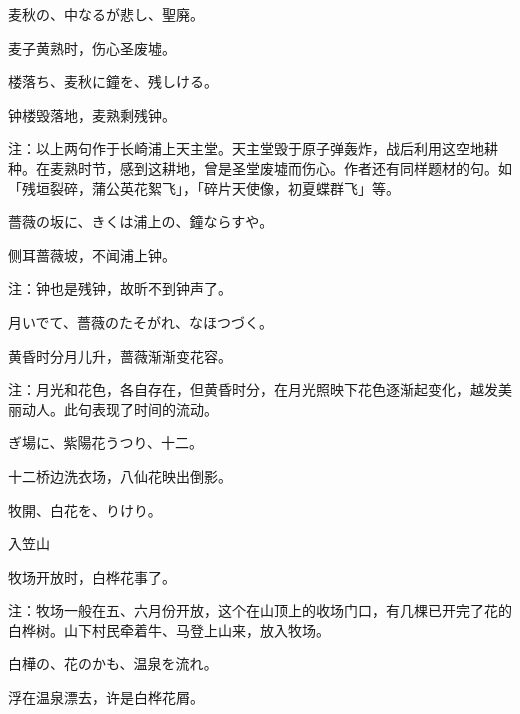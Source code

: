 \begin{haiku}
    {\FH 麦秋の、中なるが悲し、聖廃。}

    {\FK 麦子黄熟时，伤心圣废墟。}
\end{haiku}

\begin{haiku}
    {\FH {}楼落ち、麦秋に鐘を、残しける。}

    {\FK 钟楼毁落地，麦熟剩残钟。}

    {\FT 注：以上两句作于长崎浦上天主堂。天主堂毁于原子弹轰炸，战后利用这空地耕种。在麦熟时节，感到这耕地，曾是圣堂废墟而伤心。作者还有同样题材的句。如「残垣裂碎，蒲公英花絮飞」，「碎片天使像，初夏蝶群飞」等。}
\end{haiku}

\begin{haiku}
    {\FH 薔薇の坂に、きくは浦上の、鐘ならすや。}

    {\FK 侧耳蔷薇坡，不闻浦上钟。}

    {\FT 注：钟也是残钟，故昕不到钟声了。}
\end{haiku}

\begin{haiku}
    {\FH 月いでて、薔薇のたそがれ、なほつづく。}

    {\FK 黄昏时分月儿升，蔷薇渐渐变花容。}

    {\FT 注：月光和花色，各自存在，但黄昏时分，在月光照映下花色逐渐起变化，越发美丽动人。此句表现了时间的流动。}
\end{haiku}

\begin{haiku}
    {\FH {}ぎ場に、紫陽花うつり、十二。}

    {\FK 十二桥边洗衣场，八仙花映出倒影。}
\end{haiku}

\begin{haiku}
    {\FH 牧開、白花を、りけり。}

    {\FK 入笠山}

    {\FK 牧场开放时，白桦花事了。}

    {\FT 注：牧场一般在五、六月份开放，这个在山顶上的收场门口，有几棵已开完了花的白桦树。山下村民牵着牛、马登上山来，放入牧场。}
\end{haiku}

\begin{haiku}
    {\FH 白樺の、花のかも、温泉を流れ。}

    {\FK 浮在温泉漂去，许是白桦花屑。}
\end{haiku}

